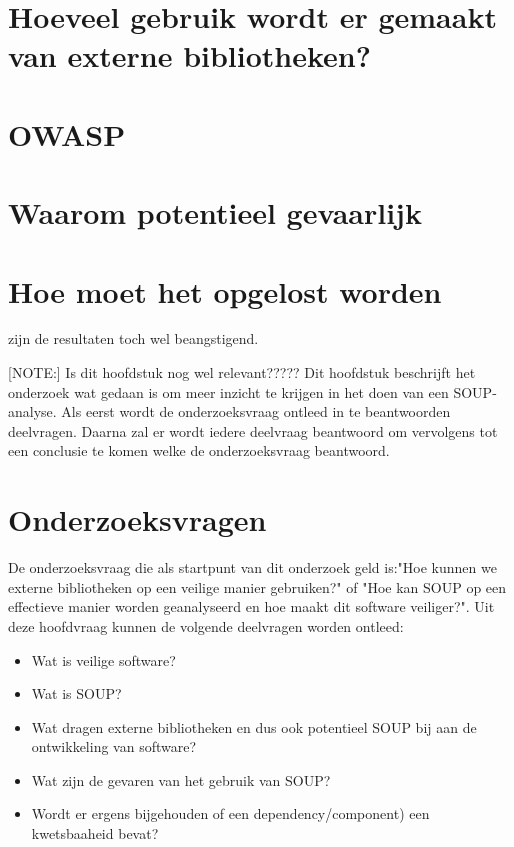 \section{Hoeveel gebruik wordt er gemaakt van externe bibliotheken?}

\section{OWASP}

\section{Waarom potentieel gevaarlijk}

\section{Hoe moet het opgelost worden}


zijn de resultaten toch wel beangstigend.



[NOTE:] Is dit hoofdstuk nog wel relevant?????
Dit hoofdstuk beschrijft het onderzoek wat gedaan is om meer inzicht te krijgen in het doen van een SOUP-analyse. Als eerst wordt de onderzoeksvraag ontleed in te beantwoorden deelvragen. Daarna zal er wordt iedere deelvraag beantwoord om vervolgens tot een conclusie te komen welke de onderzoeksvraag beantwoord.


\section{Onderzoeksvragen} \label{sec:SOUPOnderzoeksvragen}
De onderzoeksvraag die als startpunt van dit onderzoek geld is:"Hoe kunnen we externe bibliotheken op een veilige manier gebruiken?" of "Hoe kan SOUP op een effectieve manier worden geanalyseerd en hoe maakt dit software veiliger?". Uit deze hoofdvraag kunnen de volgende deelvragen worden ontleed:
\begin{itemize}
    \item Wat is veilige software?
    \item Wat is SOUP?
    \item Wat dragen externe bibliotheken en dus ook potentieel SOUP bij aan de ontwikkeling van software?
    \item Wat zijn de gevaren van het gebruik van SOUP?
    \item Wordt er ergens bijgehouden of een dependency/component) een kwetsbaaheid bevat?
\end{itemize}

